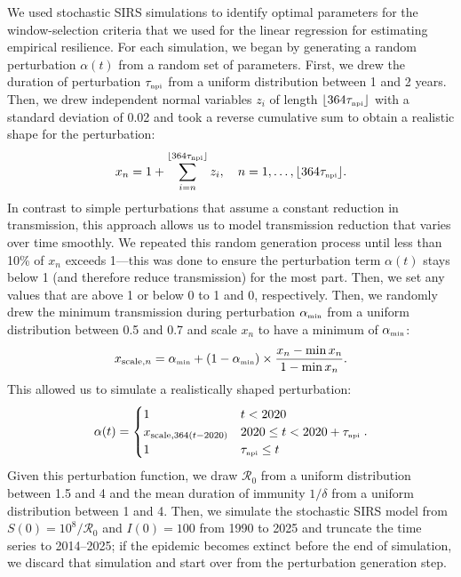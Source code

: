 \documentclass[12pt]{article}
\newcommand{\tsub}[2]{#1_{{\textrm{\tiny #2}}}}
\begin{document}
We used stochastic SIRS simulations to identify optimal parameters for the window-selection criteria that we used for the linear regression for estimating empirical resilience.
For each simulation, we began by generating a random perturbation $\alpha(t)$ from a random set of parameters.
First, we drew the duration of perturbation $\tsub{\tau}{npi}$ from a uniform distribution between 1 and 2 years.
Then, we drew independent normal variables $z_i$ of length $\lfloor 364 \tsub{\tau}{npi} \rfloor$ with a standard deviation of 0.02 and took a reverse cumulative sum to obtain a realistic shape for the perturbation:
\begin{equation}
x_n = 1 + \sum_{i=n}^{\lfloor 364 \tsub{\tau}{npi}\rfloor} z_i, \quad n = 1, \dots, \lfloor 364 \tsub{\tau}{npi}\rfloor.
\end{equation}
In contrast to simple perturbations that assume a constant reduction in transmission, this approach allows us to model transmission reduction that varies over time smoothly.
We repeated this random generation process until less than 10\% of $x_n$ exceeds 1---this was done to ensure the perturbation term $\alpha(t)$ stays below 1 (and therefore reduce transmission) for the most part.
Then, we set any values that are above 1 or below 0 to 1 and 0, respectively.
Then, we randomly drew the minimum transmission during perturbation $\tsub{\alpha}{min}$ from a uniform distribution between 0.5 and 0.7 and scale $x_n$ to have a minimum of $\tsub{\alpha}{min}$:
\begin{equation}
x_{\textrm{scale},n} =  \tsub{\alpha}{min} + (1- \tsub{\alpha}{min}) \times \frac{x_n-\min x_n}{1- \min x_n}.
\end{equation}
This allowed us to simulate a realistically shaped perturbation:
\begin{equation}
\alpha(t) = \begin{cases}
1 & t < 2020\\
x_{\textrm{scale},364(t-2020)} & 2020 \leq t < 2020 + \tsub{\tau}{npi}\\
1 & \tsub{\tau}{npi} \leq t
\end{cases}.
\end{equation}
Given this perturbation function, we draw $\mathcal R_0$ from a uniform distribution between 1.5 and 4 and the mean duration of immunity $1/\delta$ from a uniform distribution between 1 and 4.
Then, we simulate the stochastic SIRS model from $S(0) = 10^8/\mathcal R_0$ and $I(0) = 100$ from 1990 to 2025 and truncate the time series to 2014--2025;
if the epidemic becomes extinct before the end of simulation, we discard that simulation and start over from the perturbation generation step.
\end{document}
